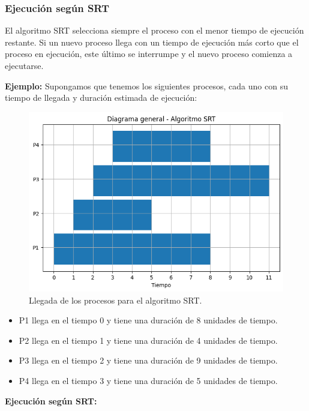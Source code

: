 \subsubsection{Ejecución según SRT}

El algoritmo SRT selecciona siempre el proceso con el menor tiempo de ejecución restante. Si un nuevo proceso llega con un tiempo de ejecución más corto que el proceso en ejecución, este último se interrumpe y el nuevo proceso comienza a ejecutarse.

\textbf{Ejemplo:} Supongamos que tenemos los siguientes procesos, cada uno con su tiempo de llegada y duración estimada de ejecución:

\begin{figure}[H] \centering \includegraphics[width=0.8\linewidth]{Imagenes/srt_diagrama.png} 
	\caption{Llegada de los procesos para el algoritmo SRT.} 
\end{figure}

\begin{itemize} 
	\item P1 llega en el tiempo 0 y tiene una duración de 8 unidades de tiempo. 
	\item P2 llega en el tiempo 1 y tiene una duración de 4 unidades de tiempo. 
	\item P3 llega en el tiempo 2 y tiene una duración de 9 unidades de tiempo. 
	\item P4 llega en el tiempo 3 y tiene una duración de 5 unidades de tiempo.
\end{itemize}

\textbf{Ejecución según SRT:}

